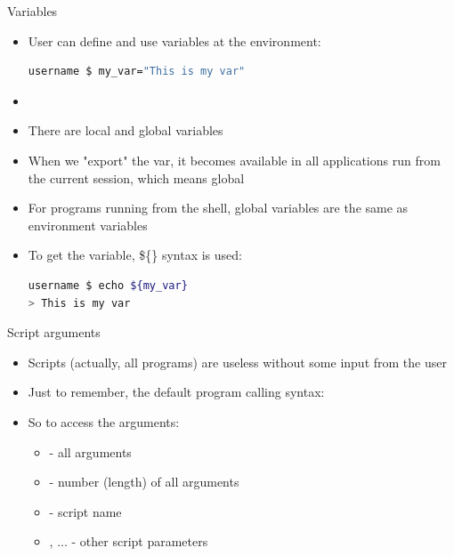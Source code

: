 \documentclass[usenames,dvipsnames,10pt,aspectratio=169]{beamer}
\begin{document}
\begin{frame}[fragile]{Variables}
    \begin{itemize}
        \item  User can define and use variables at the environment:
        \begin{lstlisting}[language=Bash, style=shellstyle]
username $ my_var="This is my var"
        \end{lstlisting}
        \item {}
        \item There are local and global variables
        \item When we "export" the var, it becomes available in all applications run from the current session, which means global 
        \item For programs running from the shell, global variables are the same as environment variables
        \item To get the variable, \$\{\} syntax is used:
        \begin{lstlisting}[language=Bash, style=shellstyle]
username $ echo ${my_var}
> This is my var
        \end{lstlisting}
    \end{itemize}
\end{frame}

\begin{frame}{Script arguments}
    \begin{itemize}
        \item Scripts (actually, all programs) are useless without some input from the user
        \item Just to remember, the default program calling syntax:
        \begin{examples}
        \end{examples}
        \item So to access the arguments:
        \begin{itemize}
            \item {} - all arguments
            \item \ex{\$\{\#\}} - number (length) of all arguments
            \item {} - script name
            \item {}, ... - other script parameters
        \end{itemize}
    \end{itemize}
\end{frame}
\end{document}
